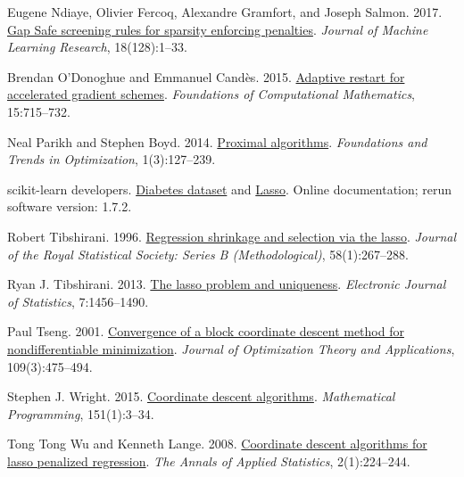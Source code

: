\documentclass[10pt,letterpaper]{article}
\begin{document}
\begin{thebibliography}{}
Eugene Ndiaye, Olivier Fercoq, Alexandre Gramfort, and Joseph Salmon. 2017.
\href{https://jmlr.org/papers/v18/16-577.html}{Gap Safe screening rules for sparsity enforcing penalties}.
\emph{Journal of Machine Learning Research}, 18(128):1--33.

Brendan O'Donoghue and Emmanuel Cand\`es. 2015.
\href{https://doi.org/10.1007/s10208-013-9150-3}{Adaptive restart for accelerated gradient schemes}.
\emph{Foundations of Computational Mathematics}, 15:715--732.

Neal Parikh and Stephen Boyd. 2014.
\href{https://doi.org/10.1561/2400000003}{Proximal algorithms}.
\emph{Foundations and Trends in Optimization}, 1(3):127--239.

scikit-learn developers.
\href{https://scikit-learn.org/stable/modules/generated/sklearn.datasets.load_diabetes.html}{Diabetes dataset}
and \href{https://scikit-learn.org/stable/modules/generated/sklearn.linear_model.Lasso.html}{Lasso}.
Online documentation; rerun software version: 1.7.2.

Robert Tibshirani. 1996.
\href{https://doi.org/10.1111/j.2517-6161.1996.tb02080.x}{Regression shrinkage and selection via the lasso}.
\emph{Journal of the Royal Statistical Society: Series B (Methodological)}, 58(1):267--288.

Ryan J. Tibshirani. 2013.
\href{https://doi.org/10.1214/13-EJS815}{The lasso problem and uniqueness}.
\emph{Electronic Journal of Statistics}, 7:1456--1490.

Paul Tseng. 2001.
\href{https://doi.org/10.1023/A:1017501703105}{Convergence of a block coordinate descent method for nondifferentiable minimization}.
\emph{Journal of Optimization Theory and Applications}, 109(3):475--494.

Stephen J. Wright. 2015.
\href{https://doi.org/10.1007/s10107-015-0892-3}{Coordinate descent algorithms}.
\emph{Mathematical Programming}, 151(1):3--34.

Tong Tong Wu and Kenneth Lange. 2008.
\href{https://doi.org/10.1214/07-AOAS147}{Coordinate descent algorithms for lasso penalized regression}.
\emph{The Annals of Applied Statistics}, 2(1):224--244.


\end{thebibliography}
\end{document}
